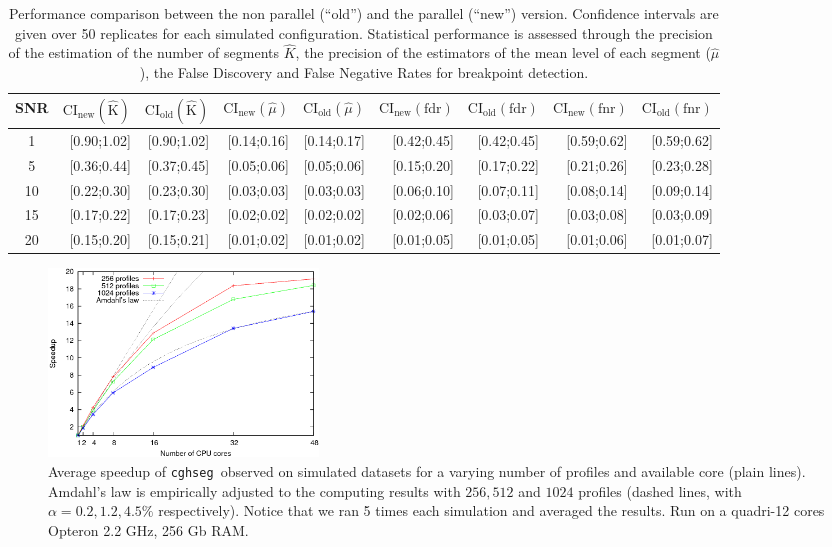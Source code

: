 \documentclass{llncs}
\newcommand{\esoft}{\texttt{cghseg }}
\begin{document}
\begin{table}[ht]
\begin{center}
\begin{small}
\begin{tabular}{|c|rr|rr|rr|rr|}
  \hline
SNR  &  $\text{CI}_{\text{new}}(\widehat{\text{K}})$ & $\text{CI}_{\text{old}}(\widehat{\text{K}})$ & $ \text{CI}_{\text{new}}(\hat{\mu})$ & $\text{CI}_{\text{old}}(\hat{\mu})$ & $\text{CI}_{\text{new}}(\text{fdr})$ & $\text{CI}_{\text{old}}(\text{fdr})$   
     & $\text{CI}_{\text{new}}(\text{fnr})$ & $\text{CI}_{\text{old}}(\text{fnr})$  \\
  \hline
  1   & [0.90;1.02] & [0.90;1.02] & [0.14;0.16] & [0.14;0.17] & [0.42;0.45] & [0.42;0.45] & [0.59;0.62] & [0.59;0.62] \\ 
  5   & [0.36;0.44] & [0.37;0.45] & [0.05;0.06] & [0.05;0.06] & [0.15;0.20] & [0.17;0.22] & [0.21;0.26] & [0.23;0.28] \\ 
  10  & [0.22;0.30] & [0.23;0.30] & [0.03;0.03] & [0.03;0.03] & [0.06;0.10] & [0.07;0.11] & [0.08;0.14] & [0.09;0.14] \\ 
  15  & [0.17;0.22] & [0.17;0.23] & [0.02;0.02] & [0.02;0.02] & [0.02;0.06] & [0.03;0.07] & [0.03;0.08] & [0.03;0.09] \\ 
  20  & [0.15;0.20] & [0.15;0.21] & [0.01;0.02] & [0.01;0.02] & [0.01;0.05] & [0.01;0.05] & [0.01;0.06] & [0.01;0.07] \\ 
   \hline
\end{tabular}
\end{small}
\end{center}
\caption{Performance comparison between the non parallel (``old'') and the parallel (``new'') version. Confidence intervals are given over 50 replicates for each simulated configuration. Statistical performance is assessed through the precision of the estimation of the number of segments $\hat{K}$, the precision of the estimators of the mean level of each segment ($\hat{\mu}$), the False Discovery and False Negative Rates for breakpoint detection.} 
\end{table}
\begin{figure}[h!]
  \begin{center}
    \includegraphics[height=5cm]{figures/speedup}
    \caption{Average speedup of \esoft observed  on simulated datasets for a varying number of profiles and available core (plain lines). Amdahl's law is empirically adjusted to the computing results with $256,512$ and $1024$ profiles (dashed lines, with $\alpha=0.2,1.2,4.5\%$ respectively). Notice that we ran 5 times each simulation and averaged the results. Run on a quadri-12 cores Opteron 2.2 GHz, 256 Gb RAM.}
    \label{figspeedup}
  \end{center}
\end{figure}
\end{document}
